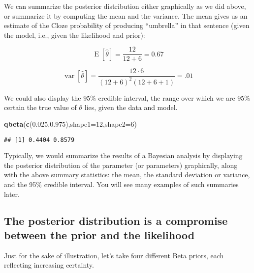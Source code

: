\documentclass[12pt,]{krantz}
\newenvironment{Shaded}{\begin{snugshade}}{\end{snugshade}}
\newcommand{\DataTypeTok}[1]{\textcolor[rgb]{0.13,0.29,0.53}{#1}}
\newcommand{\DecValTok}[1]{\textcolor[rgb]{0.00,0.00,0.81}{#1}}
\newcommand{\FloatTok}[1]{\textcolor[rgb]{0.00,0.00,0.81}{#1}}
\newcommand{\KeywordTok}[1]{\textcolor[rgb]{0.13,0.29,0.53}{\textbf{#1}}}
\newcommand{\NormalTok}[1]{#1}
\begin{document}
We can summarize the posterior distribution either graphically as we did above, or summarize it by computing the mean and the variance. The mean gives us an estimate of the Cloze probability of producing ``umbrella'' in that sentence (given the model, i.e., given the likelihood and prior):

\begin{equation}
\operatorname{E}[\hat\theta] = \frac{12}{12+6}=0.67
\label{eq:meanPb}
\end{equation}

\begin{equation}
\operatorname{var}[\hat\theta]=\frac {12 \cdot 6 }{(12 + 6 )^{2}(12 + 6 +1)}= .01
\label{eq:varPb}
\end{equation}

We could also display the 95\% credible interval, the range over which we are 95\% certain the true value of \(\theta\) lies, given the data and model.

\begin{Shaded}
\begin{Highlighting}[]
\KeywordTok{qbeta}\NormalTok{(}\KeywordTok{c}\NormalTok{(}\FloatTok{0.025}\NormalTok{,}\FloatTok{0.975}\NormalTok{),}\DataTypeTok{shape1=}\DecValTok{12}\NormalTok{,}\DataTypeTok{shape2=}\DecValTok{6}\NormalTok{)}
\end{Highlighting}
\end{Shaded}

\begin{verbatim}
## [1] 0.4404 0.8579
\end{verbatim}

Typically, we would summarize the results of a Bayesian analysis by displaying the posterior distribution of the parameter (or parameters) graphically, along with the above summary statistics: the mean, the standard deviation or variance, and the 95\% credible interval. You will see many examples of such summaries later.

\hypertarget{the-posterior-distribution-is-a-compromise-between-the-prior-and-the-likelihood}{%
\subsection{The posterior distribution is a compromise between the prior and the likelihood}\label{the-posterior-distribution-is-a-compromise-between-the-prior-and-the-likelihood}}

Just for the sake of illustration, let's take four different Beta priors, each reflecting increasing certainty.
\end{document}
